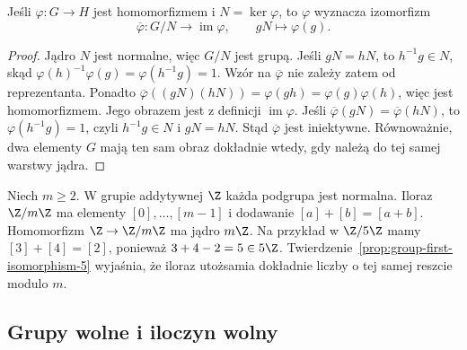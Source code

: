 \begin{stwierdzenie}
\label{prop:group-first-isomorphism-5}
Jeśli $\varphi:G\to H$ jest homomorfizmem i $N=\ker\varphi$,
to $\varphi$ wyznacza izomorfizm
\[
 \overline\varphi:G/N\longrightarrow\operatorname{im}\varphi,
 \qquad gN\longmapsto\varphi(g).
\]
\end{stwierdzenie}
\begin{proof}
Jądro $N$ jest normalne, więc $G/N$ jest grupą. Jeśli $gN=hN$,
to $h^{-1}g\in N$, skąd
$\varphi(h)^{-1}\varphi(g)=\varphi(h^{-1}g)=1$.
Wzór na $\overline\varphi$ nie zależy zatem od reprezentanta.
Ponadto
$\overline\varphi((gN)(hN))=\varphi(gh)
=\varphi(g)\varphi(h)$, więc jest homomorfizmem.
Jego obrazem jest z definicji $\operatorname{im}\varphi$.
Jeśli $\overline\varphi(gN)=\overline\varphi(hN)$, to
$\varphi(h^{-1}g)=1$, czyli $h^{-1}g\in N$ i $gN=hN$.
Stąd $\overline\varphi$ jest iniektywne. Równoważnie, dwa
elementy $G$ mają ten sam obraz dokładnie wtedy, gdy należą
do tej samej warstwy jądra.
\end{proof}

\begin{przyklad}
\label{prz:Zmodm-grupa-5}
Niech $m\geq2$.
W grupie addytywnej $\Z$ każda
podgrupa jest normalna.
Iloraz $\Z/m\Z$ ma elementy
$[0],\ldots,[m-1]$ i dodawanie
$[a]+[b]=[a+b]$. Homomorfizm
$\Z\to\Z/m\Z$ ma jądro $m\Z$.
Na przykład w $\Z/5\Z$ mamy $[3]+[4]=[2]$, ponieważ
$3+4-2=5\in5\Z$. Twierdzenie~\ref{prop:group-first-isomorphism-5}
wyjaśnia, że iloraz utożsamia dokładnie liczby o tej samej
reszcie modulo $m$.
\end{przyklad}

\subsection*{Grupy wolne i iloczyn wolny}

